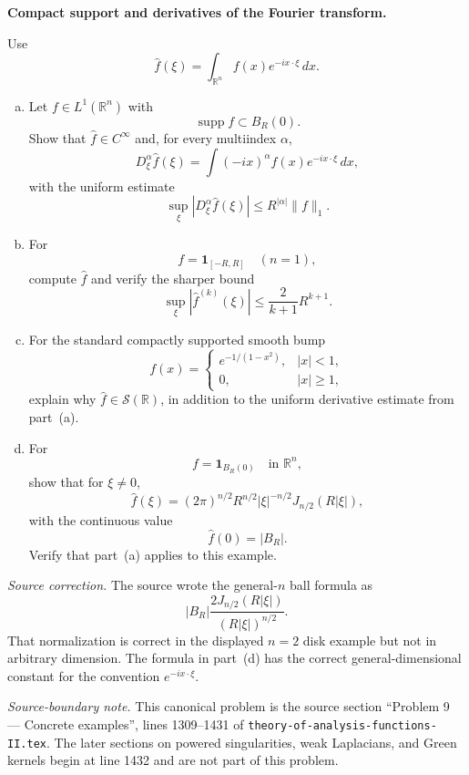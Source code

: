 \begin{problem}[CP-III-0020]
\label{prob:cp-iii-0020}
\textbf{Compact support and derivatives of the Fourier transform.}

Use
\[
\widehat f(\xi)
=
\int_{\mathbb R^n}
f(x)e^{-ix\cdot\xi}\,dx.
\]

\begin{enumerate}[(a)]
\item Let \(f\in L^1(\mathbb R^n)\) with
\[
\operatorname{supp}f
\subset
B_R(0).
\]
Show that \(\widehat f\in C^\infty\) and, for every multiindex \(\alpha\),
\[
D_\xi^\alpha\widehat f(\xi)
=
\int
(-ix)^\alpha
f(x)e^{-ix\cdot\xi}\,dx,
\]
with the uniform estimate
\[
\boxed{
\sup_\xi
|D_\xi^\alpha\widehat f(\xi)|
\le
R^{|\alpha|}\|f\|_1.}
\]

\item For
\[
f=\mathbf1_{[-R,R]}
\quad(n=1),
\]
compute \(\widehat f\) and verify the sharper bound
\[
\sup_\xi|\widehat f^{(k)}(\xi)|
\le
\frac{2}{k+1}R^{k+1}.
\]

\item For the standard compactly supported smooth bump
\[
f(x)
=
\begin{cases}
e^{-1/(1-x^2)},&|x|<1,\\
0,&|x|\ge1,
\end{cases}
\]
explain why \(\widehat f\in\mathcal S(\mathbb R)\), in addition to the
uniform derivative estimate from part~(a).

\item For
\[
f=\mathbf1_{B_R(0)}
\quad\text{in }\mathbb R^n,
\]
show that for \(\xi\ne0\),
\[
\boxed{
\widehat f(\xi)
=
(2\pi)^{n/2}
R^{n/2}
|\xi|^{-n/2}
J_{n/2}(R|\xi|),
}
\]
with the continuous value
\[
\widehat f(0)=|B_R|.
\]
Verify that part~(a) applies to this example.
\end{enumerate}

\medskip
\noindent
\textit{Source correction.}
The source wrote the general-\(n\) ball formula as
\[
|B_R|
\frac{2J_{n/2}(R|\xi|)}{(R|\xi|)^{n/2}}.
\]
That normalization is correct in the displayed \(n=2\) disk example but
not in arbitrary dimension. The formula in part~(d) has the correct
general-dimensional constant for the convention \(e^{-ix\cdot\xi}\).

\medskip
\noindent
\textit{Source-boundary note.}
This canonical problem is the source section
``Problem 9 --- Concrete examples'', lines 1309--1431 of
\texttt{theory-of-analysis-functions-II.tex}. The later sections on
powered singularities, weak Laplacians, and Green kernels begin at line
1432 and are not part of this problem.
\end{problem}

